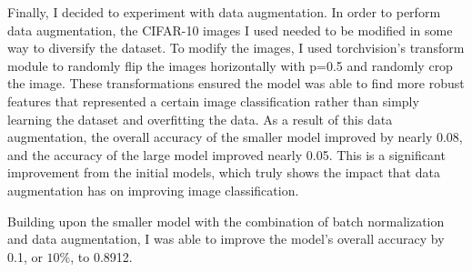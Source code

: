 \documentclass[11pt,a4paper]{article}
\begin{document}
Finally, I decided to experiment with data augmentation. In order to perform data augmentation, the CIFAR-10 images I used needed
 to be modified in some way to diversify the dataset. To modify the images, I used torchvision's transform module to randomly flip 
 the images horizontally with p=0.5 and randomly crop the image. These transformations ensured the model was able to find more robust 
 features that represented a certain image classification rather than simply learning the dataset and overfitting the data. As a 
 result of this data augmentation, the overall accuracy of the smaller model improved by nearly 0.08, and the accuracy of the large 
 model improved nearly 0.05. This is a significant improvement from the initial models, which truly shows the impact that data 
 augmentation has on improving image classification.

Building upon the smaller model with the combination of batch normalization and data augmentation, I was able to improve the
 model's overall accuracy by 0.1, or $10\%$, to 0.8912.


\printbibliography
\end{document}

